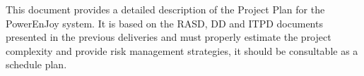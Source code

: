 This document provides a detailed description of the Project Plan for the PowerEnJoy system. It is based on the RASD, DD and ITPD documents presented in the previous deliveries and must properly estimate the project complexity and provide risk management strategies, it should be consultable as a schedule plan.
